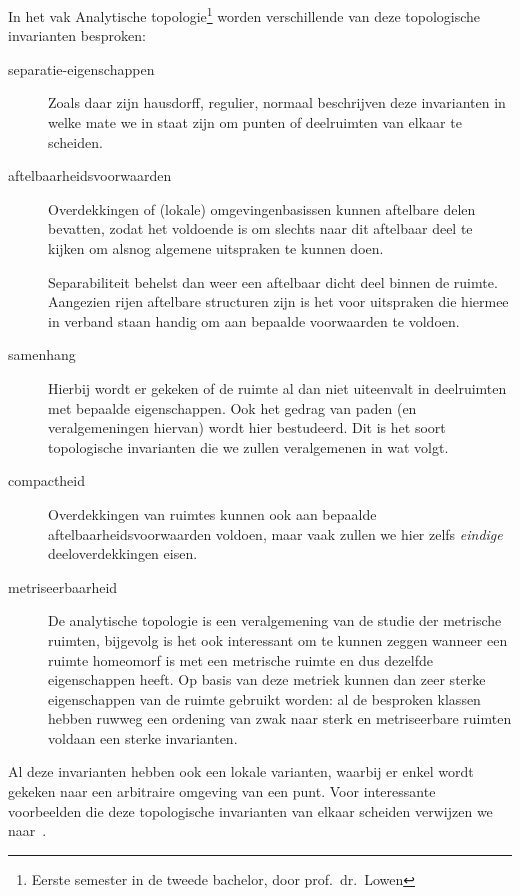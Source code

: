 \documentclass[a4paper,11pt,openany,oneside,article]{memoir}
\begin{document}
In het vak Analytische topologie\footnote{Eerste semester in de tweede bachelor, door prof.~dr.~Lowen} worden verschillende van deze topologische invarianten besproken:
\begin{description}
  \item[separatie-eigenschappen] Zoals daar zijn hausdorff, regulier, normaal beschrijven deze invarianten in welke mate we in staat zijn om punten of deelruimten van elkaar te scheiden. 

  \item[aftelbaarheidsvoorwaarden] Overdekkingen of (lokale) omgevingenbasissen kunnen aftelbare delen bevatten, zodat het voldoende is om slechts naar dit aftelbaar deel te kijken om alsnog algemene uitspraken te kunnen doen.
    
    Separabiliteit behelst dan weer een aftelbaar dicht deel binnen de ruimte. Aangezien rijen aftelbare structuren zijn is het voor uitspraken die hiermee in verband staan handig om aan bepaalde voorwaarden te voldoen.
    
  \item[samenhang] Hierbij wordt er gekeken of de ruimte al dan niet uiteenvalt in deelruimten met bepaalde eigenschappen. Ook het gedrag van paden (en veralgemeningen hiervan) wordt hier bestudeerd. Dit is het soort topologische invarianten die we zullen veralgemenen in wat volgt.

  \item[compactheid] Overdekkingen van ruimtes kunnen ook aan bepaalde aftelbaarheidsvoorwaarden voldoen, maar vaak zullen we hier zelfs \emph{eindige} deeloverdekkingen eisen. 

  \item[metriseerbaarheid] De analytische topologie is een veralgemening van de studie der metrische ruimten, bijgevolg is het ook interessant om te kunnen zeggen wanneer een ruimte homeomorf is met een metrische ruimte en dus dezelfde eigenschappen heeft. Op basis van deze metriek kunnen dan zeer sterke eigenschappen van de ruimte gebruikt worden: al de besproken klassen hebben ruwweg een ordening van zwak naar sterk en metriseerbare ruimten voldaan een sterke invarianten.
\end{description}

Al deze invarianten hebben ook een lokale varianten, waarbij er enkel wordt gekeken naar een arbitraire omgeving van een punt. Voor interessante voorbeelden die deze topologische invarianten van elkaar scheiden verwijzen we naar~\cite{counterexamples-in-topology}.
\vspace{1em}
\end{document}
